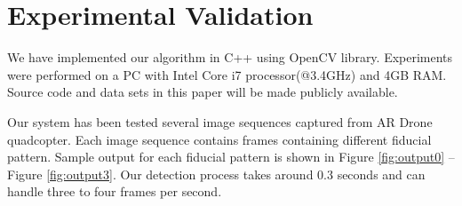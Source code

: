 \documentclass[runningheads]{llncs}
\begin{document}
\section{Experimental Validation}

We have implemented our algorithm in C++ using OpenCV library.
Experiments were performed on a PC with Intel Core i7 processor(@3.4GHz) and 4GB RAM.
Source code and data sets in this paper will be made publicly available.

Our system has been tested several image sequences captured from AR Drone
quadcopter. Each image sequence contains frames containing different fiducial
pattern. Sample output for each fiducial pattern is shown in Figure
\ref{fig:output0} -- Figure \ref{fig:output3}. Our detection process takes
around 0.3 seconds and can handle three to four frames per second.
\end{document}
